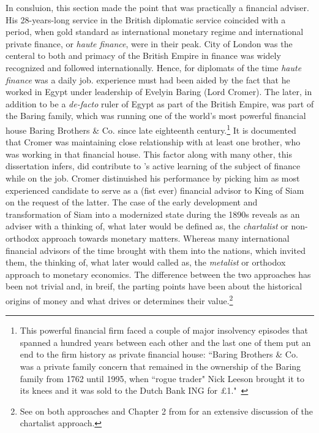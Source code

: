 In consluion, this section made the point that \citeauthor{innes1913} was practically a financial adviser. His 28-years-long service in the British diplomatic service coincided with a period, when gold standard as international monetary regime and international private finance, or \textit{haute finance}, were in their peak. City of London was the centeral to both and primacy of the British Empire in finance was widely recognized and followed internationally. Hence, for diplomats of the time \textit{haute finance} was a daily job. \citeauthor{innes1913} experience must had been aided by the fact that he worked in Egypt under leadership of Evelyin Baring (Lord Cromer). The later, in addition to be a \textit{de-facto} ruler of Egypt as part of the British Empire, was part of the Baring family, which was running one of the world's most powerful financial house Baring Brothers \& Co. since late eighteenth century.\footnote{This powerful financial firm faced a couple of major insolvency episodes that spanned a hundred years between each other and the last one of them put an end to the firm history as private financial house:  ``Baring Brothers \& Co. was a private family concern that remained in the ownership of the Baring family from 1762 until 1995, when ``rogue trader" Nick Leeson brought it to its knees and it was sold to the Dutch Bank ING for \pounds1."~\citep[p.~v]{tearle2010}} It is documented that Cromer was maintaining close relationship with at least one brother, who was working in that financial house. This factor along with many other, this dissertation infers, did contribute to \citeauthor{innes1913}'s active learning of the subject of finance while on the job. Cromer distinuished his performance by picking him as most experienced candidate to serve as a (fist ever) financial advisor to King of Siam on the request of the latter. The case of the early development and transformation of Siam into a modernized state during the 1890s reveals \citeauthor{innes1913} as an adviser with a thinking of, what later would be defined as, the \textit{chartalist} or non-orthodox approach towards monetary matters. Whereas many international financial advisors of the time brought with them  into the nations, which invited them, the thinking of, what later would called as, the \textit{metalist} or orthodox approach to monetary economics. The difference between the two approaches has been not trivial and, in breif, the parting points have been about the historical origins of money and what drives or determines their value.\footnote{See \cite{goodhart} on both approaches and Chapter 2 from \cite{wray1998} for an extensive discussion of the chartalist approach.}


